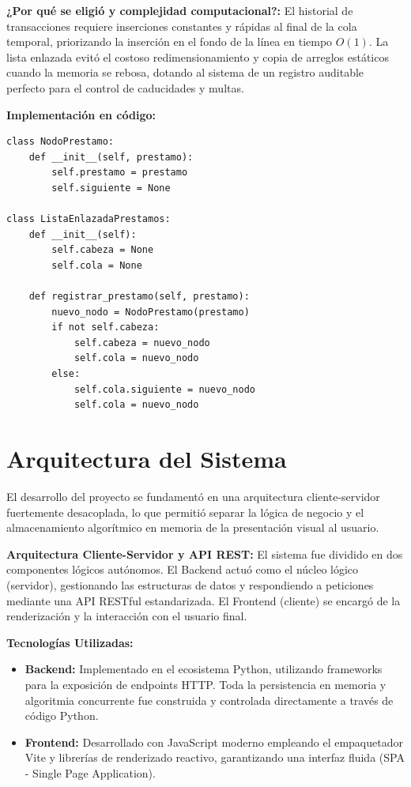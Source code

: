 \documentclass{rapport}
\begin{document}
\textbf{¿Por qué se eligió y complejidad computacional?:} El historial de transacciones requiere inserciones constantes y rápidas al final de la cola temporal, priorizando la inserción en el fondo de la línea en tiempo $O(1)$. La lista enlazada evitó el costoso redimensionamiento y copia de arreglos estáticos cuando la memoria se rebosa, dotando al sistema de un registro auditable perfecto para el control de caducidades y multas.

\textbf{Implementación en código:}
\begin{verbatim}
class NodoPrestamo:
    def __init__(self, prestamo):
        self.prestamo = prestamo
        self.siguiente = None

class ListaEnlazadaPrestamos:
    def __init__(self):
        self.cabeza = None
        self.cola = None
        
    def registrar_prestamo(self, prestamo):
        nuevo_nodo = NodoPrestamo(prestamo)
        if not self.cabeza:
            self.cabeza = nuevo_nodo
            self.cola = nuevo_nodo
        else:
            self.cola.siguiente = nuevo_nodo
            self.cola = nuevo_nodo
\end{verbatim}

\section{Arquitectura del Sistema}

El desarrollo del proyecto se fundamentó en una arquitectura cliente-servidor fuertemente desacoplada, lo que permitió separar la lógica de negocio y el almacenamiento algorítmico en memoria de la presentación visual al usuario.

\textbf{Arquitectura Cliente-Servidor y API REST:} El sistema fue dividido en dos componentes lógicos autónomos. El Backend actuó como el núcleo lógico (servidor), gestionando las estructuras de datos y respondiendo a peticiones mediante una API RESTful estandarizada. El Frontend (cliente) se encargó de la renderización y la interacción con el usuario final.

\textbf{Tecnologías Utilizadas:}
\begin{itemize}
    \item \textbf{Backend:} Implementado en el ecosistema Python, utilizando frameworks para la exposición de endpoints HTTP. Toda la persistencia en memoria y algoritmia concurrente fue construida y controlada directamente a través de código Python.
    \item \textbf{Frontend:} Desarrollado con JavaScript moderno empleando el empaquetador Vite y librerías de renderizado reactivo, garantizando una interfaz fluida (SPA - Single Page Application).
\end{itemize}
\end{document}
